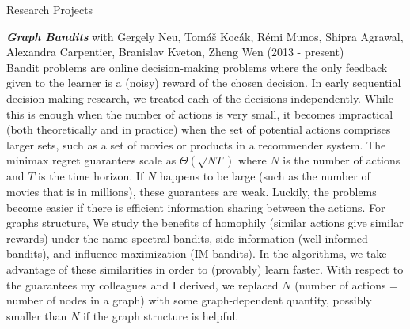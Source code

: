 \documentclass{resume}
\begin{document}
\begin{category}{Research Projects}

\citembullet \emph{\bf Graph Bandits} with Gergely Neu, Tom\'a\v s Koc\' ak, R\'emi Munos, Shipra Agrawal, Alexandra Carpentier, Branislav Kveton, Zheng Wen
(2013 - present)\\
 Bandit problems are online decision-making problems where the only feedback given to the learner is a (noisy) reward of the chosen decision. In early sequential decision-making research, we treated each of the decisions independently. While this is enough when the number of actions is very small, it becomes impractical (both theoretically and in practice) when the set of potential actions comprises larger sets, such as a set of movies or products in a recommender system. The minimax regret guarantees scale as $\Theta(\sqrt{NT})$  where $N$ is the number of actions and $T$ is the time horizon. If $N$ happens to be large (such as the number of movies that is in millions), these guarantees are weak. Luckily, the problems become easier if there is efficient information sharing between the actions. For graphs structure, We study the benefits of homophily (similar actions give similar rewards) under the name spectral bandits, side information (well-informed bandits), and influence maximization (IM bandits). In the algorithms, we take advantage of these similarities in order to (provably) learn faster. With respect to the guarantees my colleagues and I derived, we replaced $N$ (number of actions = number of nodes in a graph) with some graph-dependent quantity, possibly smaller than $N$ if the graph structure is helpful.


\end{category}
\end{document}
